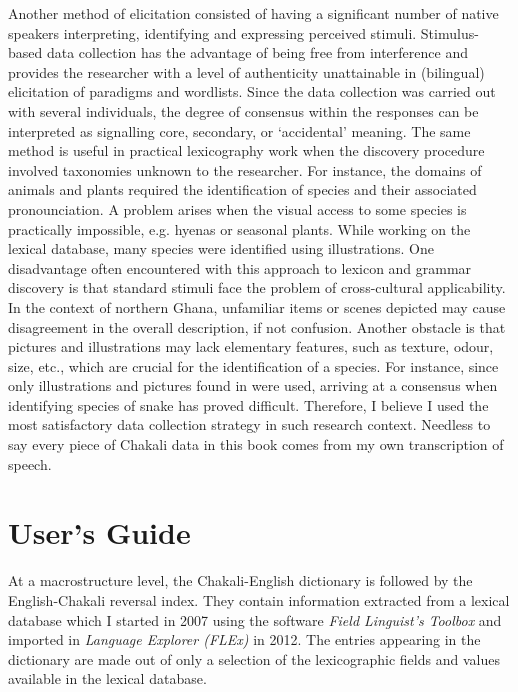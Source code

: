 Another method of 
elicitation 
consisted of having a significant number of native speakers interpreting,
identifying and expressing perceived stimuli.  Stimulus-based data collection
has the advantage of being free from interference and provides the researcher
with a level of authenticity unattainable in (bilingual) elicitation of
paradigms
and wordlists.  Since the data collection was carried
out with several individuals, the degree of consensus within the responses can
be interpreted as signalling core, secondary, or `accidental'
meaning. The same method is useful in practical lexicography work
when the discovery procedure involved  taxonomies unknown to the researcher. For
instance, the domains of animals and plants required the identification of
species and their associated pronounciation. A problem arises when the visual
access to some species  is practically
impossible, e.g.   hyenas or seasonal plants. While working on  the 
lexical database, many species were identified using
illustrations. One disadvantage often encountered with this approach to lexicon
and
grammar discovery is that standard stimuli  face
the problem  of cross-cultural applicability.  In the context of  northern 
Ghana, unfamiliar items or scenes depicted may cause
disagreement in
the overall description, if not confusion.  
Another obstacle is that pictures and illustrations may lack 
elementary features, such as texture, odour, size, etc., 
which are crucial for
 the identification of a species.  For
instance,
since  only  illustrations and pictures found in \citet{Cans61, Trap06} were 
used,  arriving at a consensus when identifying  
species of snake has proved difficult.   Therefore,  I believe I used the most 
satisfactory data collection strategy in such research context. Needless to say 
every piece of Chakali data in this book comes from my own transcription of 
speech. 
 
 
 


\section{User's Guide}
\label{sec:cont-descr}

At a macrostructure level, the Chakali-English dictionary is followed by the 
English-Chakali reversal index.  They contain information extracted  from a  
lexical database which I started   in 2007 using the software {\it Field 
Linguist’s Toolbox}  and imported in {\it Language Explorer (FLEx)} in  2012.  
The entries appearing in the dictionary are made out of  only a selection of  
the lexicographic fields and values available in the lexical database.

